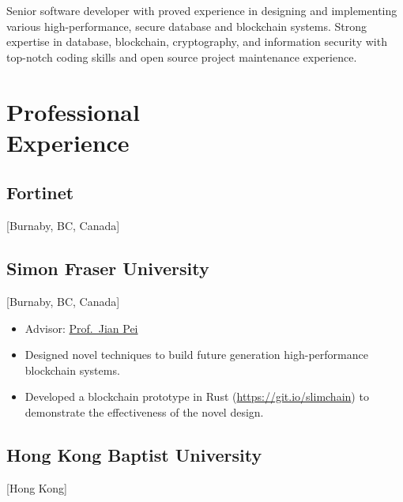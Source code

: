 \documentclass{mycv}
\begin{document}
\maketitle%

\begin{summary}
Senior software developer with proved experience in designing and implementing various high-performance, secure database and blockchain systems. Strong expertise in database, blockchain, cryptography, and information security with top-notch coding skills and open source project maintenance experience.
\end{summary}

\section{Professional \\ Experience}

\subsection{Fortinet}[Burnaby, BC, Canada]
\begin{positions}
\end{positions}

\subsection{Simon Fraser University}[Burnaby, BC, Canada]
\begin{positions}
\end{positions}

\begin{itemize}
  \item Advisor: \href{https://sites.google.com/view/jpei/jian-peis-homepage}{Prof.~Jian Pei}
  \item Designed novel techniques to build future generation high-performance blockchain systems.
  \item Developed a blockchain prototype in Rust (\url{https://git.io/slimchain}) to demonstrate the effectiveness of the novel design.
\end{itemize}

\subsection{Hong Kong Baptist University}[Hong Kong]
\begin{positions}
\end{positions}
\end{document}
